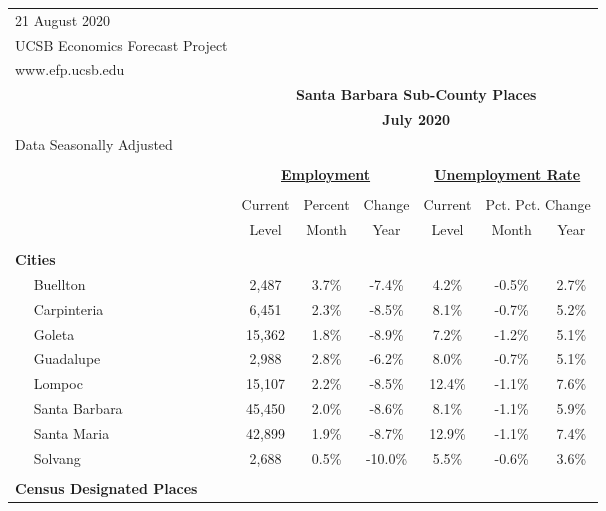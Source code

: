\documentclass[12pt]{article}
\begin{document}
\begin{landscape}
\begin{table}
\begin{tabular}{|l|c|c|c||c|c|c|}
\multicolumn{1}{l}{\small 21 August 2020} & \multicolumn{6}{c}{} \\
\multicolumn{1}{l}{\small UCSB Economics Forecast Project} & \multicolumn{6}{c}{} \\
\multicolumn{1}{l}{\small www.efp.ucsb.edu} & \multicolumn{6}{c}{} \\
\multicolumn{1}{c}{} & \multicolumn{6}{c}{\large \textbf{Santa Barbara Sub-County Places}} \\
\multicolumn{1}{c}{} & \multicolumn{6}{c}{\large \textbf{July 2020}} \\
\multicolumn{7}{l}{\small Data Seasonally Adjusted} \\ \hline \hline
& \multicolumn{5}{c}{} & \\
& \multicolumn{3}{c}{\textbf{\underline{Employment}} } & \multicolumn{3}{c}{\textbf{\underline{Unemployment Rate}} } \vline \\
& \multicolumn{2}{c}{} & & \multicolumn{2}{c}{} & \\
& Current & \multicolumn{1}{r}{Percent} & Change & Current & \multicolumn{2}{c}{Pct. Pct. Change} \vline \\
& Level & Month & Year & Level & Month & Year \\ \hline
&&&&&& \\
\textbf{Cities} &&&&&& \\
$\quad$ Buellton & 2,487 & 3.7\% & -7.4\% & 4.2\% & -0.5\% & 2.7\% \\
$\quad$ Carpinteria & 6,451 & 2.3\% & -8.5\% & 8.1\% & -0.7\% & 5.2\% \\
$\quad$ Goleta & 15,362 & 1.8\% & -8.9\% & 7.2\% & -1.2\% & 5.1\% \\
$\quad$ Guadalupe & 2,988 & 2.8\% & -6.2\% & 8.0\% & -0.7\% & 5.1\% \\
$\quad$ Lompoc & 15,107 & 2.2\% & -8.5\% & 12.4\% & -1.1\% & 7.6\% \\
$\quad$ Santa Barbara & 45,450 & 2.0\% & -8.6\% & 8.1\% & -1.1\% & 5.9\% \\
$\quad$ Santa Maria & 42,899 & 1.9\% & -8.7\% & 12.9\% & -1.1\% & 7.4\% \\
$\quad$ Solvang & 2,688 & 0.5\% & -10.0\% & 5.5\% & -0.6\% & 3.6\% \\
&&&&&& \\
\textbf{Census Designated Places} &&&&&& \\

\end{tabular}
\end{table}
\end{landscape}
\end{document}
